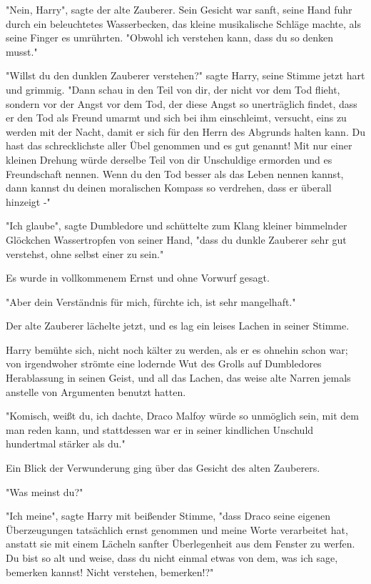 {"Nein, Harry", sagte der alte Zauberer. Sein Gesicht war sanft, seine Hand fuhr durch ein beleuchtetes Wasserbecken, das kleine musikalische Schläge machte, als seine Finger es umrührten. "Obwohl ich verstehen kann, dass du so denken musst."

"Willst du den dunklen Zauberer verstehen?" sagte Harry, seine Stimme jetzt hart und grimmig. "Dann schau in den Teil von dir, der nicht vor dem Tod flieht, sondern vor der Angst vor dem Tod, der diese Angst so unerträglich findet, dass er den Tod als Freund umarmt und sich bei ihm einschleimt, versucht, eins zu werden mit der Nacht, damit er sich für den Herrn des Abgrunds halten kann. Du hast das schrecklichste aller Übel genommen und es gut genannt! Mit nur einer kleinen Drehung würde derselbe Teil von dir Unschuldige ermorden und es Freundschaft nennen. Wenn du den Tod besser als das Leben nennen kannst, dann kannst du deinen moralischen Kompass so verdrehen, dass er überall hinzeigt -"

"Ich glaube", sagte Dumbledore und schüttelte zum Klang kleiner bimmelnder Glöckchen Wassertropfen von seiner Hand, "dass du dunkle Zauberer sehr gut verstehst, ohne selbst einer zu sein."

Es wurde in vollkommenem Ernst und ohne Vorwurf gesagt.

"Aber dein Verständnis für mich, fürchte ich, ist sehr mangelhaft."

Der alte Zauberer lächelte jetzt, und es lag ein leises Lachen in seiner Stimme.

Harry bemühte sich, nicht noch kälter zu werden, als er es ohnehin schon war; von irgendwoher strömte eine lodernde Wut des Grolls auf Dumbledores Herablassung in seinen Geist, und all das Lachen, das weise alte Narren jemals anstelle von Argumenten benutzt hatten.

"Komisch, weißt du, ich dachte, Draco Malfoy würde so unmöglich sein, mit dem man reden kann, und stattdessen war er in seiner kindlichen Unschuld hundertmal stärker als du."

Ein Blick der Verwunderung ging über das Gesicht des alten Zauberers.

"Was meinst du?"

"Ich meine", sagte Harry mit beißender Stimme, "dass Draco seine eigenen Überzeugungen tatsächlich ernst genommen und meine Worte verarbeitet hat, anstatt sie mit einem Lächeln sanfter Überlegenheit aus dem Fenster zu werfen. Du bist so alt und weise, dass du nicht einmal etwas von dem, was ich sage, bemerken kannst! Nicht verstehen, bemerken!?"

}
